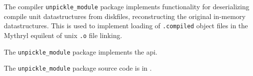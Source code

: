 
The compiler {\tt unpickle\_module} package implements functionality for 
deserializing compile unit datastructures from diskfiles, reconstructing 
the original in-memory datastructures.  This is used to implement loading 
of {\tt .compiled} object files in the Mythryl equilent of unix {\tt .o} file 
linking.

The {\tt unpickle\_module} package implements the  api.

The {\tt unpickle\_module} package source code is in .

